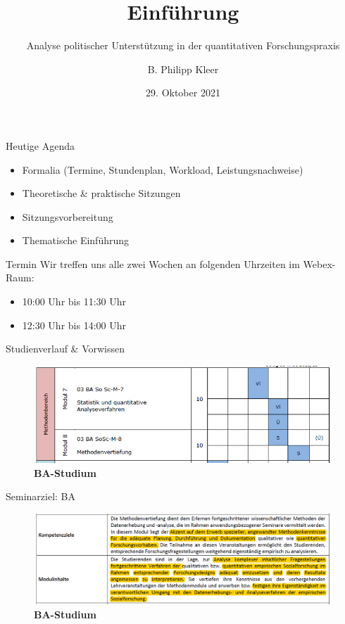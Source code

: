 \documentclass[11pt]{beamer}
\title{Einführung}
\subtitle{Analyse politischer Unterstützung in der quantitativen Forschungspraxis}
\date{29. Oktober 2021}
\author{B. Philipp Kleer}
\institute{Institut für Politikwissenschaft | Justus-Liebig-Universität Gießen}
\begin{document}
\begin{frame}
	\maketitle
\end{frame}

\begin{frame}[t]{Heutige Agenda}
	\begin{itemize}
		\item Formalia (Termine, Stundenplan, Workload, Leistungsnachweise)
		\item Theoretische \& praktische Sitzungen
		\item Sitzungsvorbereitung
		\item Thematische Einführung
	\end{itemize}
\end{frame}

\begin{frame}[t]{Termin}
Wir treffen uns alle zwei Wochen an folgenden Uhrzeiten im  Webex-Raum:
	\begin{itemize}
		\item 10:00 Uhr bis 11:30 Uhr 
		\item 12:30 Uhr bis 14:00 Uhr
	\end{itemize}
\end{frame}

\begin{frame}[t]{Studienverlauf \& Vorwissen}
	\begin{center}
		\begin{figure}[ht]
			\includegraphics[width=\textwidth]{pics/pre1.png}
			\caption{\textbf{BA-Studium}}
		\end{figure}
	\end{center}
\end{frame}

\begin{frame}[t]{Seminarziel: BA}
	\begin{figure}[ht]
		\includegraphics[width=\textwidth]{pics/pre2.png}
		\caption{\textbf{BA-Studium}}
	\end{figure}
\end{frame}
\end{document}

